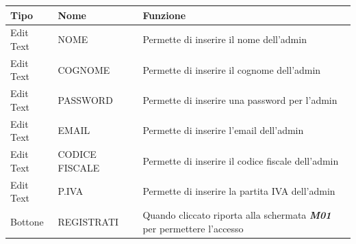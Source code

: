         \begin{tabular}{lll}
            \hline
            \textbf{Tipo}   &   \textbf{Nome}   &   \textbf{Funzione} \\
            \hline
            Edit Text    &   NOME    &   Permette di inserire il nome dell'admin \\
            \hline
            Edit Text & COGNOME   &  Permette di inserire il cognome dell'admin \\
            \hline
            Edit Text    &   PASSWORD    &   Permette di inserire una password per l'admin \\
            \hline
            Edit Text    &   EMAIL   &   Permette di inserire l'email dell'admin \\
            \hline
            Edit Text    & CODICE FISCALE    & Permette di inserire il codice fiscale dell'admin \\
            \hline
            Edit Text    &   P.IVA   & Permette di inserire la partita IVA dell'admin \\
            \hline
            Bottone &   REGISTRATI  & Quando cliccato riporta alla schermata \textit{\textbf{M01}} per permettere l'accesso \\
            \hline
        \end{tabular}
        \newpage
